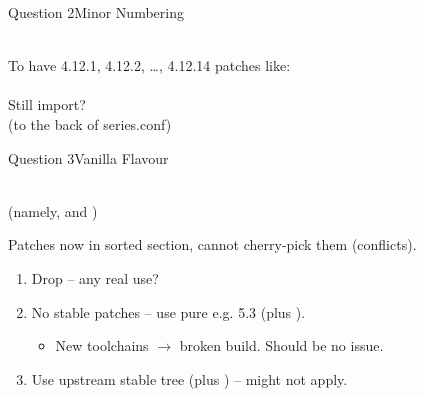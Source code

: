 \begin{frame}{Question 2}{Minor Numbering}

  \begin{center}
     \\[2ex]

    To have 4.12.1, 4.12.2, \dots, 4.12.14 patches like: \\[1ex]
     \\[1ex]
    \pause
    Still import? \\[1ex]
    (to the back of series.conf)
  \end{center}

\end{frame}

\begin{frame}{Question 3}{Vanilla Flavour}

  \begin{center}
     \\
    (namely,  and ) \\[2ex]

    \pause

    Patches now in sorted section, cannot cherry-pick them (conflicts). \\
  \end{center}

  \vspace{2ex}
  \pause

  \begin{enumerate}[<+->]
    \item Drop  -- any real use?
    \item No stable patches -- use pure e.g. 5.3 (plus ).
      \begin{itemize}
	\item New toolchains $\rightarrow$ broken build. Should be no issue.
      \end{itemize}
    \item Use upstream stable tree (plus ) --  might
      not apply.
  \end{enumerate}

\end{frame}

%
%
%
%
%
%


